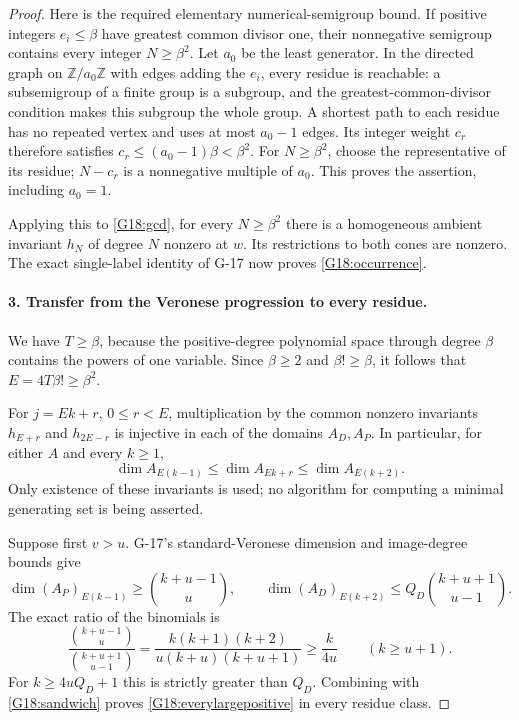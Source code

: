 \begin{proof}
Here is the required elementary numerical-semigroup bound. If
positive integers $e_i\leq\beta$ have greatest common divisor one,
their nonnegative semigroup contains every integer $N\geq\beta^2$.
Let $a_0$ be the least generator. In the directed graph on
$\mathbb Z/a_0\mathbb Z$ with edges adding the $e_i$, every residue
is reachable: a subsemigroup of a finite group is a subgroup, and
the greatest-common-divisor condition makes this subgroup the whole
group. A shortest path to each residue has no repeated vertex and
uses at most $a_0-1$ edges. Its integer weight $c_r$ therefore
satisfies $c_r\leq(a_0-1)\beta<\beta^2$. For $N\geq\beta^2$,
choose the representative of its residue; $N-c_r$ is a nonnegative
multiple of $a_0$. This proves the assertion, including $a_0=1$.

Applying this to \eqref{G18:gcd}, for every $N\geq\beta^2$ there
is a homogeneous ambient invariant $h_N$ of degree $N$ nonzero
at $w$. Its restrictions to both cones are nonzero. The exact
single-label identity of G-17 now proves \eqref{G18:occurrence}.

\paragraph{3. Transfer from the Veronese progression to every residue.}
We have $T\geq\beta$, because the positive-degree polynomial
space through degree $\beta$ contains the powers of one variable.
Since $\beta\geq2$ and $\beta!\geq\beta$, it follows that
$E=4T\beta!\geq\beta^2$.

For $j=Ek+r$, $0\leq r<E$, multiplication by the common nonzero
invariants $h_{E+r}$ and $h_{2E-r}$ is injective in each of the
domains $A_D,A_P$. In particular, for either $A$ and every $k\geq1$,
\begin{equation}\label{G18:sandwich}
 \dim A_{E(k-1)}\leq\dim A_{Ek+r}\leq\dim A_{E(k+2)}.
\end{equation}
Only existence of these invariants is used; no algorithm for
computing a minimal generating set is being asserted.

Suppose first $v>u$. G-17's standard-Veronese dimension and
image-degree bounds give
\[
 \dim(A_P)_{E(k-1)}\geq\binom{k+u-1}{u},\qquad
 \dim(A_D)_{E(k+2)}\leq Q_D\binom{k+u+1}{u-1}.
\]
The exact ratio of the binomials is
\[
 \frac{\binom{k+u-1}{u}}{\binom{k+u+1}{u-1}}
 =\frac{k(k+1)(k+2)}{u(k+u)(k+u+1)}
 \geq\frac{k}{4u}\qquad(k\geq u+1).
\]
For $k\geq4uQ_D+1$ this is strictly greater than $Q_D$.
Combining with \eqref{G18:sandwich} proves
\eqref{G18:everylargepositive} in every residue class.


\end{proof}
